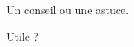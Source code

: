 \begin{bdoctip}
    Un conseil ou une astuce.
\end{bdoctip}

\begin{bdoctip}
    Utile ?
\end{bdoctip}
